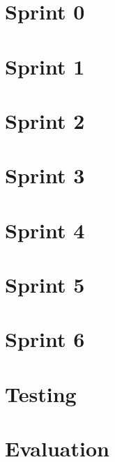 \documentclass{report}
\begin{document}
\chapter{Sprint 0}


\chapter{Sprint 1}


\chapter{Sprint 2}
%

\chapter{Sprint 3}
%

\chapter{Sprint 4}
%

\chapter{Sprint 5}
%

\chapter{Sprint 6}
%

\chapter{Testing}
%

\chapter{Evaluation}
%
\end{document}

